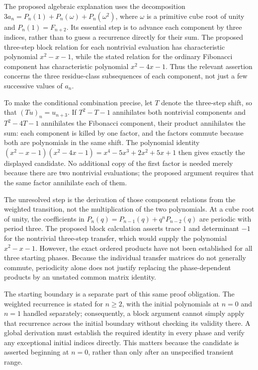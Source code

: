 \documentclass[11pt]{article}
\begin{document}
The proposed algebraic explanation uses the decomposition $3a_n=P_n(1)+P_n(\omega)+P_n(\omega^2)$, where $\omega$ is a primitive cube root of unity and $P_n(1)=F_{n+2}$. Its essential step is to advance each component by three indices, rather than to guess a recurrence directly for their sum. The proposed three-step block relation for each nontrivial evaluation has characteristic polynomial $x^2-x-1$, while the stated relation for the ordinary Fibonacci component has characteristic polynomial $x^2-4x-1$. Thus the relevant assertion concerns the three residue-class subsequences of each component, not just a few successive values of $a_n$.

To make the conditional combination precise, let $T$ denote the three-step shift, so that $(Tu)_n=u_{n+3}$. If $T^2-T-1$ annihilates both nontrivial components and $T^2-4T-1$ annihilates the Fibonacci component, their product annihilates the sum: each component is killed by one factor, and the factors commute because both are polynomials in the same shift. The polynomial identity $(x^2-x-1)(x^2-4x-1)=x^4-5x^3+2x^2+5x+1$ then gives exactly the displayed candidate. No additional copy of the first factor is needed merely because there are two nontrivial evaluations; the proposed argument requires that the same factor annihilate each of them.

The unresolved step is the derivation of those component relations from the weighted transition, not the multiplication of the two polynomials. At a cube root of unity, the coefficients in $P_n(q)=P_{n-1}(q)+q^nP_{n-2}(q)$ are periodic with period three. The proposed block calculation asserts trace $1$ and determinant $-1$ for the nontrivial three-step transfer, which would supply the polynomial $x^2-x-1$. However, the exact ordered products have not been established for all three starting phases. Because the individual transfer matrices do not generally commute, periodicity alone does not justify replacing the phase-dependent products by an unstated common matrix identity.

The starting boundary is a separate part of this same proof obligation. The weighted recurrence is stated for $n\geq 2$, with the initial polynomials at $n=0$ and $n=1$ handled separately; consequently, a block argument cannot simply apply that recurrence across the initial boundary without checking its validity there. A global derivation must establish the required identity in every phase and verify any exceptional initial indices directly. This matters because the candidate is asserted beginning at $n=0$, rather than only after an unspecified transient range.
\end{document}
